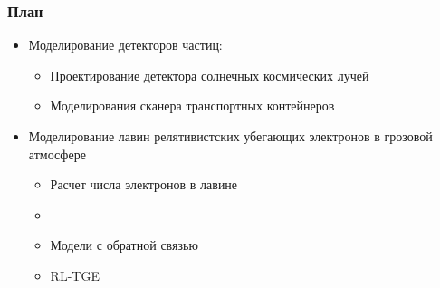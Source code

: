 \begin{frame}
    \setcounter{framenumber}{1}
    \maketitle
\end{frame}

\begin{frame}
\frametitle{План}
    \begin{itemize}
        \item Моделирование детекторов частиц:
        \begin{itemize}
        	\item Проектирование детектора солнечных космических лучей
        	\item Моделирования сканера транспортных контейнеров
        \end{itemize}
    	 \item Моделирование лавин релятивистских убегающих электронов в грозовой атмосфере
	    \begin{itemize}
	        \item Расчет числа электронов в лавине
		    \item {}
		    \item Модели с обратной связью
		    \item RL-TGE
	    \end{itemize}

       

    \end{itemize}
\end{frame}

%
%
%
%

